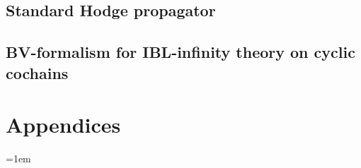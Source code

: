 \documentclass[11pt,
a4paper,
twoside,%
openright, %
final
]{scrbook}
\providecommand{\MainFolder}{.} %
\providecommand{\SubfilesFolder}{\MainFolder/Subfiles} %
\begin{document}




\chapter{Standard Hodge propagator}
\label{Chap:Prpg}






\chapter{BV-formalism for IBL-infinity theory on cyclic cochains}





%

\part{Appendices}
\appendix






\backmatter
{}
{}%

\emergencystretch=1em
\printbibliography
\end{document}
